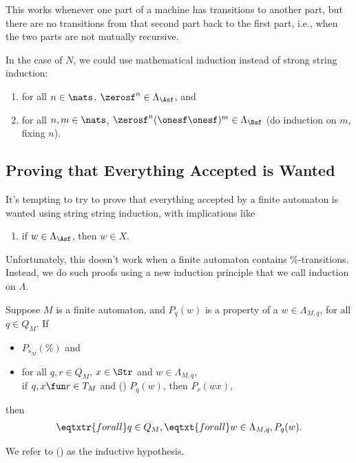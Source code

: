 This works whenever one part of a machine has transitions to
another part, but there are no transitions from that second part
back to the first part, i.e., when the two parts are not mutually
recursive.

In the case of $N$, we could use mathematical induction instead of
strong string induction:
\begin{enumerate}[\quad(A)]
\item for all $n\in\nats$, $\zerosf^n\in\Lambda_\Asf$, and

\item for all $n,m\in\nats$, $\zerosf^n(\onesf\onesf)^m\in\Lambda_\Bsf$
(do induction on $m$, fixing $n$).
\end{enumerate}

\subsection{Proving that Everything Accepted is Wanted}

It's tempting to try to prove that everything accepted by a finite
automaton is wanted using string string induction, with implications
like
\begin{enumerate}[\quad(A)]
\item if $w\in\Lambda_\Asf$, then $w\in X$.
\end{enumerate}
Unfortunately, this doesn't work when a finite automaton contains
$\%$-transitions.  Instead, we do such proofs using a new induction
principle that we call induction on $\Lambda$.

\begin{theorem}
Suppose $M$ is a finite automaton, and $P_q(w)$ is a property
of a $w\in\Lambda_{M,q}$, for all $q\in Q_M$.
If
\begin{itemize}
\item $P_{s_M}(\%)$ and

\item for all $q,r\in Q_M$, $x\in\Str$ and $w\in\Lambda_{M,q}$,\\
if $q, x\fun r\in T_M$ and (\dag) $P_q(w)$, then  $P_r(wx)$,
\end{itemize}
then
\begin{gather*}
\eqtxtr{for all}q\in Q_M,\eqtxt{for all}w\in\Lambda_{M,q}, P_q(w) .
\end{gather*}
\end{theorem}

We refer to (\dag) as the inductive hypothesis.

